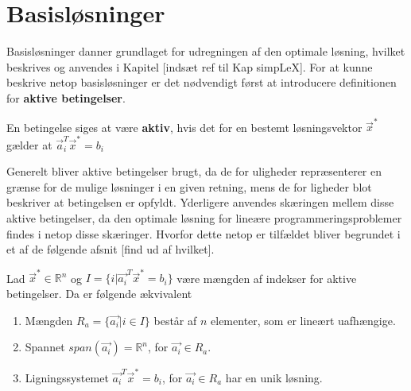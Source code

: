 \section{Basisløsninger}


Basisløsninger danner grundlaget for udregningen af den optimale løsning, hvilket beskrives og anvendes i Kapitel [indsæt ref til Kap simpLeX]. For at kunne beskrive netop basisløsninger er det nødvendigt først at introducere definitionen for \textbf{aktive betingelser}.

\begin{defn}
En betingelse siges at være \textbf{aktiv}, hvis det for en bestemt løsningsvektor $\vec{x}^*$ gælder at $\vec{a}_i^T \vec{x}^* = b_i$
\label{def:aktiv}
\end{defn}

Generelt bliver aktive betingelser brugt, da de for uligheder repræsenterer en grænse for de mulige løsninger i en given retning, mens de for ligheder blot beskriver at betingelsen er opfyldt.
Yderligere anvendes skæringen mellem disse aktive betingelser, da den optimale løsning for lineære programmeringsproblemer findes i netop disse skæringer. Hvorfor dette netop er tilfældet bliver begrundet i et af de følgende afsnit [find ud af hvilket].

\begin{stn}
Lad $\vec{x}^* \in \mathds{R}^n$ og $I = \{i | \vec{a_i}^T \vec{x}^* = b_i\}$ være mængden af indekser for aktive betingelser. Da er følgende ækvivalent
\begin{enumerate}[label=(\alph*)]
\item Mængden $R_a =\{\vec{a_i}| i\in I\}$ består af $n$ elementer, som er lineært uafhængige.
\item Spannet $span(\vec{a_i}) = \mathds{R}^n$, for $\vec{a_i} \in R_a$.
\item Ligningssystemet $\vec{a_i}^T \vec{x}^* = b_i$, for $\vec{a_i} \in R_a$ har en unik løsning.
\end{enumerate}
\label{stn:uniklosning}
\end{stn}

